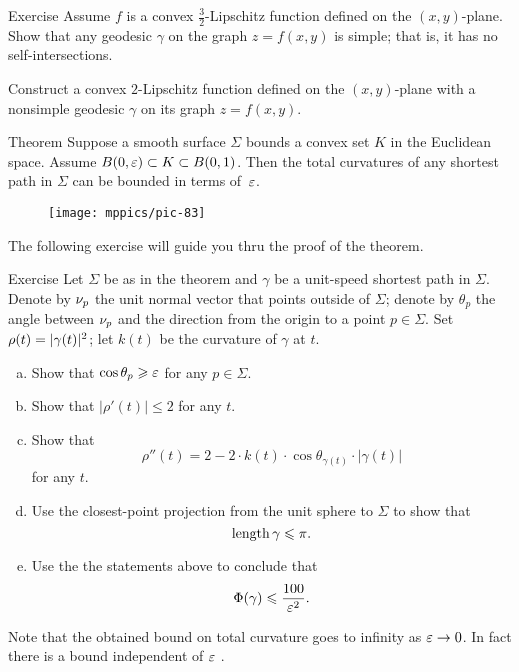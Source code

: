 \begin{thm}{Exercise}\label{ex:rough-bound-mountain}
Assume $f$ is a convex $\tfrac32$-Lipschitz function defined on the $(x,y)$-plane.
Show that any geodesic $\gamma$ on the graph $z=f(x,y)$ is simple;
that is, it has no self-intersections.

Construct a convex $2$-Lipschitz function defined on the $(x,y)$-plane
with a nonsimple geodesic $\gamma$ on its graph $z=f(x,y)$.
\end{thm}


\begin{thm}{Theorem}\label{thm:tc-of-mingeod}
Suppose a smooth surface $\Sigma$ bounds a convex set $K$ in the Euclidean space.
Assume $B(0,\varepsilon)\subset K\subset B(0,1)$.
Then the total curvatures of any shortest path in $\Sigma$ can be bounded in terms of~$\varepsilon$. 
\end{thm}

\begin{wrapfigure}{r}{48 mm}
\vskip-4mm
\centering
\texttt{[image: mppics/pic-83]}
\vskip-0mm
\end{wrapfigure}

The following exercise will guide you thru the proof of the theorem. 

\begin{thm}{Exercise}\label{ex:bound-tc}
Let $\Sigma$ be as in the theorem and $\gamma$ be a unit-speed shortest path in $\Sigma$.
Denote by $\nu_p$ the unit normal vector that points outside of $\Sigma$;
denote by $\theta_p$ the angle between $\nu_p$ and the direction from the origin to a point $p\in\Sigma$.
Set $\rho(t)\z=|\gamma(t)|^2$; let $k(t)$ be the curvature of $\gamma$ at $t$.
\begin{enumerate}[(a)]
\item Show that $\cos\theta_p\geqslant \varepsilon$ for any $p\in \Sigma$.
\item Show that $|\rho'(t)|\le 2$ for any $t$.
\item Show that 
\[\rho''(t)=2-2\cdot k(t)\cdot \cos \theta_{\gamma(t)}\cdot |\gamma(t)|\]
for any $t$.
\item Use the closest-point projection from the unit sphere to $\Sigma$ to show that 
\[\mathop{\rm length}\nolimits \gamma\leqslant \pi.\]
\item Use the the statements above to conclude that 
\[\Phi({\gamma})\leqslant \frac{100}{\varepsilon^2}.\]
\end{enumerate}
\end{thm}

Note that the obtained bound on total curvature goes to infinity as $\varepsilon\to 0$.
In fact there is a bound independent of $\varepsilon$ \cite{lebedeva-petrunin}.
